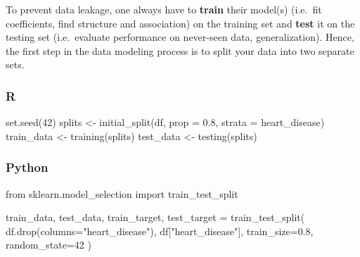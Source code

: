 \documentclass[
  letterpaper,
  DIV=11,
  numbers=noendperiod]{scrreprt}
\newenvironment{Shaded}{\begin{snugshade}}{\end{snugshade}}
\newcommand{\AttributeTok}[1]{\textcolor[rgb]{0.40,0.46,0.14}{#1}}
\newcommand{\DecValTok}[1]{\textcolor[rgb]{0.68,0.00,0.00}{#1}}
\newcommand{\FloatTok}[1]{\textcolor[rgb]{0.68,0.00,0.00}{#1}}
\newcommand{\FunctionTok}[1]{\textcolor[rgb]{0.28,0.35,0.67}{#1}}
\newcommand{\ImportTok}[1]{\textcolor[rgb]{0.00,0.46,0.62}{#1}}
\newcommand{\NormalTok}[1]{\textcolor[rgb]{0.00,0.46,0.62}{#1}}
\newcommand{\OperatorTok}[1]{\textcolor[rgb]{0.37,0.37,0.37}{#1}}
\newcommand{\OtherTok}[1]{\textcolor[rgb]{0.00,0.46,0.62}{#1}}
\newcommand{\StringTok}[1]{\textcolor[rgb]{0.13,0.47,0.30}{#1}}
\begin{document}
To prevent data leakage, one always have to \textbf{train} their
model(s) (i.e.~fit coefficients, find structure and association) on the
training set and \textbf{test} it on the testing set (i.e.~evaluate
performance on never-seen data, generalization). Hence, the first step
in the data modeling process is to split your data into two separate
sets.

\hypertarget{r-52}{%
\subsubsection{R}\label{r-52}}

\begin{Shaded}
\begin{Highlighting}[]
\FunctionTok{set.seed}\NormalTok{(}\DecValTok{42}\NormalTok{)}
\NormalTok{splits }\OtherTok{\textless{}{-}} \FunctionTok{initial\_split}\NormalTok{(df, }\AttributeTok{prop =} \FloatTok{0.8}\NormalTok{, }\AttributeTok{strata =}\NormalTok{ heart\_disease)}
\NormalTok{train\_data }\OtherTok{\textless{}{-}} \FunctionTok{training}\NormalTok{(splits)}
\NormalTok{test\_data }\OtherTok{\textless{}{-}} \FunctionTok{testing}\NormalTok{(splits)}
\end{Highlighting}
\end{Shaded}

\hypertarget{python-52}{%
\subsubsection{Python}\label{python-52}}

\begin{Shaded}
\begin{Highlighting}[]
\ImportTok{from}\NormalTok{ sklearn.model\_selection }\ImportTok{import}\NormalTok{ train\_test\_split}

\NormalTok{train\_data, test\_data, train\_target, test\_target }\OperatorTok{=}\NormalTok{ train\_test\_split(}
\NormalTok{    df.drop(columns}\OperatorTok{=}\StringTok{"heart\_disease"}\NormalTok{), df[}\StringTok{"heart\_disease"}\NormalTok{],}
\NormalTok{    train\_size}\OperatorTok{=}\FloatTok{0.8}\NormalTok{,}
\NormalTok{    random\_state}\OperatorTok{=}\DecValTok{42}
\NormalTok{)}
\end{Highlighting}
\end{Shaded}
\end{document}
